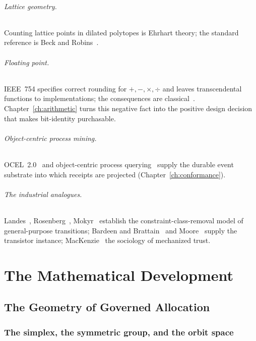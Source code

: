 \documentclass[12pt,oneside]{report}
\theoremstyle{plain}
\theoremstyle{definition}
\theoremstyle{remark}
\begin{document}
\paragraph{Lattice geometry.}
Counting lattice points in dilated polytopes is Ehrhart theory; the
standard reference is Beck and Robins~\cite{beck2007}.

\paragraph{Floating point.}
IEEE~754 specifies correct rounding for $+,-,\times,\div$ and leaves
transcendental functions to implementations; the consequences are
classical~\cite{goldberg1991,ieee754}. Chapter~\ref{ch:arithmetic} turns
this negative fact into the positive design decision that makes
bit-identity purchasable.

\paragraph{Object-centric process mining.}
OCEL~2.0~\cite{ocel2,pm4py} and object-centric process
querying~\cite{ocpq} supply the durable event substrate into which
receipts are projected (Chapter~\ref{ch:conformance}).

\paragraph{The industrial analogues.}
Landes~\cite{landes1969}, Rosenberg~\cite{rosenberg1976},
Mokyr~\cite{mokyr1990} establish the constraint-class-removal model of
general-purpose transitions; Bardeen and Brattain~\cite{bardeen1948}
and Moore~\cite{moore1965} supply the transistor instance;
MacKenzie~\cite{mackenzie2001} the sociology of mechanized trust.

\part{The Mathematical Development}

\chapter{The Geometry of Governed Allocation}
\label{ch:geometry}

\section{The simplex, the symmetric group, and the orbit space}
\end{document}
